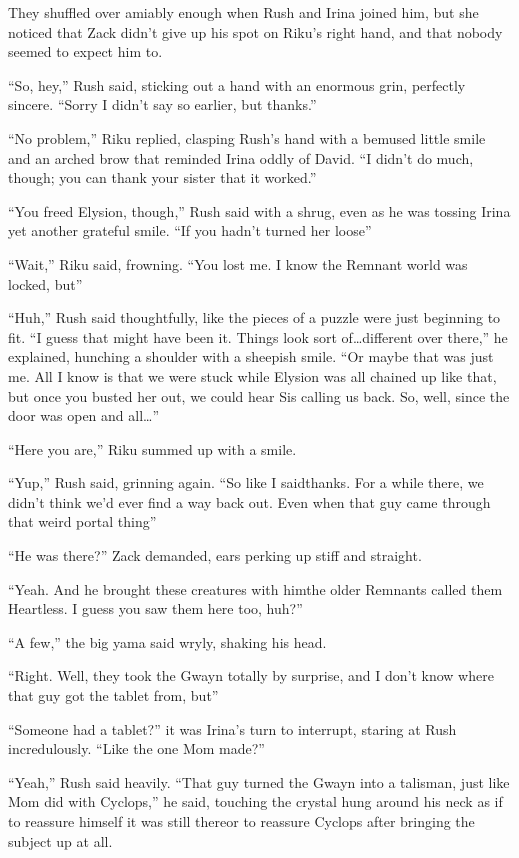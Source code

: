 They shuffled over amiably enough when Rush and Irina joined him, but she noticed that Zack didn't give up his spot on Riku's right hand, and that nobody seemed to expect him to.

``So, hey,'' Rush said, sticking out a hand with an enormous grin, perfectly sincere. ``Sorry I didn't say so earlier, but thanks.''

``No problem,'' Riku replied, clasping Rush's hand with a bemused little smile and an arched brow that reminded Irina oddly of David. ``I didn't do much, though; you can thank your sister that it worked.''

``You freed Elysion, though,'' Rush said with a shrug, even as he was tossing Irina yet another grateful smile. ``If you hadn't turned her loose\textemdash ''

``Wait,'' Riku said, frowning. ``You lost me. I know the Remnant world was locked, but\textemdash ''

``Huh,'' Rush said thoughtfully, like the pieces of a puzzle were just beginning to fit. ``I guess that might have been it. Things look sort of\ldots different over there,'' he explained, hunching a shoulder with a sheepish smile. ``Or maybe that was just me. All I know is that we were stuck while Elysion was all chained up like that, but once you busted her out, we could hear Sis calling us back. So, well, since the door was open and all\ldots ''

``Here you are,'' Riku summed up with a smile.

``Yup,'' Rush said, grinning again. ``So like I said\textemdash thanks. For a while there, we didn't think we'd ever find a way back out. Even when that guy came through that weird portal thing\textemdash ''

``He was there?'' Zack demanded, ears perking up stiff and straight.

``Yeah. And he brought these creatures with him\textemdash the older Remnants called them Heartless. I guess you saw them here too, huh?''

``A few,'' the big yama said wryly, shaking his head.

``Right. Well, they took the Gwayn totally by surprise, and I don't know where that guy got the tablet from, but\textemdash ''

``Someone had a tablet?'' it was Irina's turn to interrupt, staring at Rush incredulously. ``Like the one Mom made?''

``Yeah,'' Rush said heavily. ``That guy turned the Gwayn into a talisman, just like Mom did with Cyclops,'' he said, touching the crystal hung around his neck as if to reassure himself it was still there\textemdash or to reassure Cyclops after bringing the subject up at all.

